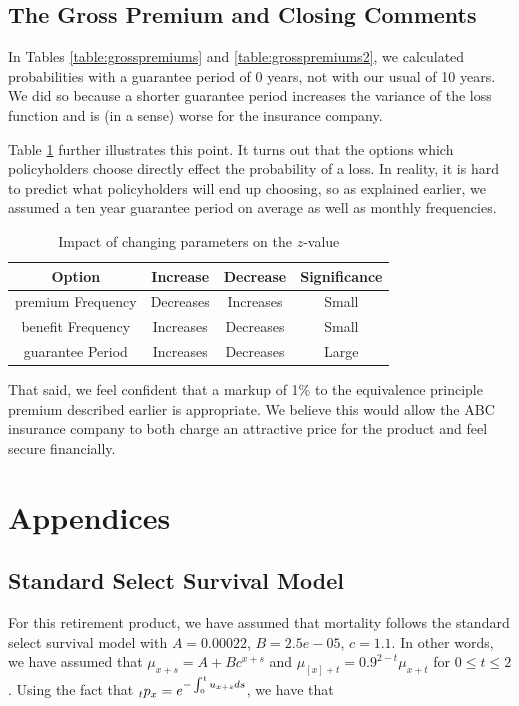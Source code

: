 \documentclass[12pt]{article}
\begin{document}
\subsection{The Gross Premium and Closing Comments}

In Tables \ref{table:grosspremiums} and \ref{table:grosspremiums2}, we calculated probabilities with a guarantee period of 0 years, not with our usual of 10 years. We did so because a shorter guarantee period increases the variance of the loss function and is (in a sense) worse for the insurance company.

Table \ref{table:impactzvalue} further illustrates this point. It turns out that the options which policyholders choose directly effect the probability of a loss. In reality, it is hard to predict what policyholders will end up choosing, so as explained earlier, we assumed a ten year guarantee period on average as well as monthly frequencies.

\begin{table}[!ht] 
\centering 
\begin{tabular}{c c c c }
\hline
Option & Increase & Decrease & Significance \\ [0.5ex]
\hline  
premium Frequency & Decreases & Increases & Small\\
benefit Frequency & Increases & Decreases & Small \\
guarantee Period & Increases & Decreases & Large \\
\hline  
\end{tabular} 
\caption{Impact of changing parameters on the $z$-value}  
\label{table:impactzvalue} 
\end{table} 

That said, we feel confident that a markup of 1\% to the equivalence principle premium described earlier is appropriate. We believe this would allow the ABC insurance company to both charge an attractive price for the product and feel secure financially.

\newpage
\section{Appendices}

\subsection{Standard Select Survival Model}

For this retirement product, we have assumed that mortality follows the standard select survival model with $A=0.00022$, $B=2.5e-05$, $c=1.1$. In other words, we have assumed that $\mu_{x+s} = A + Bc^{x+s}$ and $\mu_{[x]+t}=0.9^{2-t}\mu_{x+t}$ for $0\le t \le 2$. Using the fact that $\hspace{0mm}_tp_x=e^{-\int_{0}^{t}u_{x+s}ds}$, we have that
\end{document}
